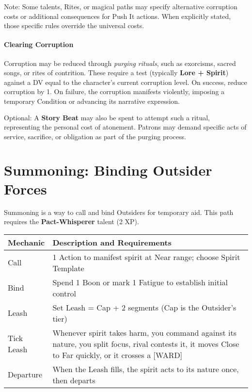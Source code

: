 Note: Some talents, Rites, or magical paths may specify alternative corruption costs or additional consequences for Push It actions. When explicitly stated, those specific rules override the universal costs.

\paragraph{Clearing Corruption}
Corruption may be reduced through \textit{purging rituals}, such as exorcisms, sacred songs, or rites of contrition. 
These require a test (typically \textbf{Lore + Spirit}) against a DV equal to the character’s current corruption level.  
On success, reduce corruption by 1. On failure, the corruption manifests violently, imposing a temporary Condition or advancing its narrative expression.  

Optional: A \textbf{Story Beat} may also be spent to attempt such a ritual, representing the personal cost of atonement. Patrons may demand specific acts of service, sacrifice, or obligation as part of the purging process.
\section*{Summoning: Binding Outsider Forces}

Summoning is a way to call and bind Outsiders for temporary aid. This path requires the \textbf{Pact-Whisperer} talent (2 XP).

\begin{fatebox}
\begin{tabularx}{\textwidth}{lX}
\toprule
\textbf{Mechanic} & \textbf{Description and Requirements} \\
\midrule
Call & 1 Action to manifest spirit at Near range; choose Spirit Template \\
Bind & Spend 1 Boon or mark 1 Fatigue to establish initial control \\
Leash & Set Leash = Cap + 2 segments (Cap is the Outsider's tier) \\
Tick Leash & Whenever spirit takes harm, you command against its nature, you split focus, rival contests it, it moves Close to Far quickly, or it crosses a [WARD] \\
Departure & When the Leash fills, the spirit acts to its nature once, then departs \\
\bottomrule
\end{tabularx}
\end{fatebox}

